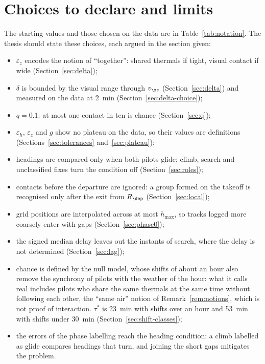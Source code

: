 \section{Choices to declare and limits}\label{sec:parameters}

The starting values and those chosen on the data are in Table~\ref{tab:notation}. The thesis
should state these choices, each argued in the section given:
\begin{itemize}
  \item $\varepsilon_z$ encodes the notion of ``together'': shared thermals if tight, visual
        contact if wide (Section~\ref{sec:delta});
  \item $\delta$ is bounded by the visual range through $v_\xc$ (Section~\ref{sec:delta}) and
        measured on the data at 2~min (Section~\ref{sec:delta-choice});
  \item $q=0.1$: at most one contact in ten is chance (Section~\ref{sec:q});
  \item $\varepsilon_h$, $\varepsilon_z$ and $g$ show no plateau on the data, so their values are
        definitions (Sections~\ref{sec:tolerances} and~\ref{sec:plateau});
  \item headings are compared only when both pilots glide; climb, search and unclassified fixes
        turn the condition off (Section~\ref{sec:roles}); 
  \item contacts before the departure are ignored: a group formed on the takeoff is recognised
        only after the exit from $R_\dep$ (Section~\ref{sec:local});
  \item grid positions are interpolated across at most $h_{\max}$, so tracks logged more coarsely
        enter with gaps (Section~\ref{sec:phase0});
  \item the signed median delay leaves out the instants of search, where the delay is not
        determined (Section~\ref{sec:lag});
  \item chance is defined by the null model, whose shifts of about an hour also remove the
        synchrony of pilots with the weather of the hour: what it calls real includes pilots who
        share the same thermals at the same time without following each other, the ``same air''
        notion of Remark~\ref{rem:notions}, which is not proof of interaction. $\tau^*$ is 23~min
        with shifts over an hour and 53~min with shifts under 30~min
        (Section~\ref{sec:shift-classes});
  \item the errors of the phase labelling reach the heading condition: a climb labelled as glide
        compares headings that turn, and joining the short gaps mitigates the problem.
\end{itemize}

